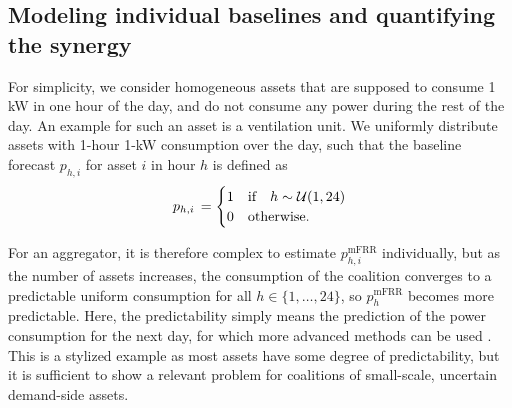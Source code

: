 \documentclass[conference]{IEEEtran}
\begin{document}

\subsection{Modeling individual baselines and quantifying the synergy}
For simplicity, we consider homogeneous assets that are supposed to consume 1 kW in one hour of the day, and do not consume any power during the rest of the day. An example for such an asset is a ventilation unit. We uniformly distribute assets with 1-hour 1-kW consumption over the day, such that the baseline forecast $p_{h, i}$ for asset $i$ in hour $h$ is defined as
%
\begin{align}\label{eq:uniform}
    p_{h,i} \thinspace = \begin{cases}
                             1 & \text{if} \quad h  \sim \mathcal{U}(1,24) \\
                             0 & \text{otherwise.}
                         \end{cases}
\end{align}

For an aggregator, it is therefore complex to estimate $p^{\text{mFRR}}_{h, i}$ individually, but as the number of assets increases, the consumption of the coalition converges to a predictable uniform consumption for all $h \in \{1, \hdots, 24 \}$, so $p^{\text{mFRR}}_{h}$ becomes more predictable. Here, the predictability simply means the prediction of the power consumption for the next day, for which more advanced methods can be used \cite{ziras2021baselines}.
This is a stylized example as most assets have some degree of predictability, but it is sufficient to show a  relevant problem for coalitions of small-scale, uncertain demand-side assets. 
\end{document}
